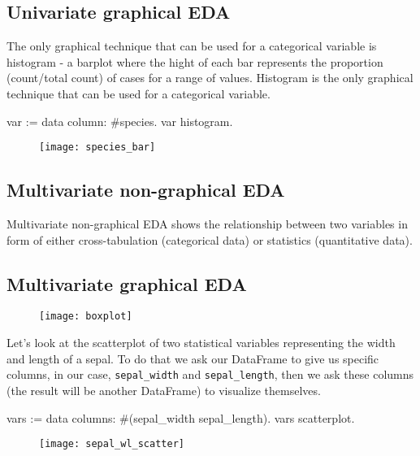 \documentclass{article}
\begin{document}
\begin{multicols}{2}
\subsection{Univariate graphical EDA}

The only graphical technique that can be used for a categorical variable is histogram - a barplot where the hight of each bar represents the proportion (count/total count) of cases for a range of values.
Histogram is the only graphical technique that can be used for a categorical variable.

\begin{code}{}
var := data column: #species.
var histogram.
\end{code}

\begin{figure}[H]
  \begin{center}
  \texttt{[image: species\_bar]}
  \end{center}
\end{figure}

\subsection{Multivariate non-graphical EDA}
Multivariate non-graphical EDA shows the relationship between two variables in form of either cross-tabulation (categorical data) or statistics (quantitative data).

\subsection{Multivariate graphical EDA}
\begin{figure}[H]
  \begin{center}
  \texttt{[image: boxplot]}
  \end{center}
\end{figure}

Let's look at the scatterplot of two statistical variables representing the width and length of a sepal. To do that we ask our DataFrame to give us specific columns, in our case, \texttt{sepal\_width} and \texttt{sepal\_length}, then we ask these columns (the result will be another DataFrame) to visualize themselves.

\begin{code}{}
vars := data columns: #(sepal_width sepal_length).
vars scatterplot.
\end{code}

\begin{figure}[H]
  \begin{center}
  \texttt{[image: sepal\_wl\_scatter]}
  \end{center}
\end{figure}


\end{multicols}
\end{document}
